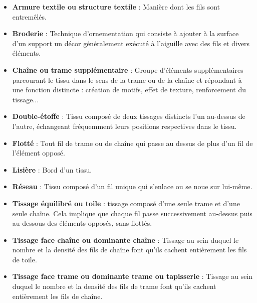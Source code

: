  \begin{itemize}
 	\item \textbf{Armure textile ou structure textile} : Manière dont les fils sont entremêlés.
	\item \textbf{Broderie} : Technique d'ornementation qui consiste à ajouter à la surface d'un support un décor généralement exécuté à l'aiguille avec des fils et divers éléments.
	\item \textbf{Chaîne ou trame supplémentaire} : Groupe d'éléments supplémentaires parcourant le tissu dans le sens de la trame ou de la chaîne et répondant à une fonction distincte : création de motifs, effet de texture, renforcement du tissage...
	\item \textbf{Double-étoffe} : Tissu composé de deux tissages distincts l'un au-dessus de l'autre, échangeant fréquemment leurs positions respectives dans le tissu.
	\item \textbf{Flotté} : Tout fil de trame ou de chaîne qui passe au dessus de plus d'un fil de l'élément opposé.
	\item \textbf{Lisière} : Bord d'un tissu.
	\item \textbf{Réseau} : Tissu composé d'un fil unique qui s'enlace ou se noue sur lui-même.
	\item \textbf{Tissage équilibré ou toile} : tissage composé d'une seule trame et d'une seule chaîne. Cela implique que chaque fil passe successivement au-dessus puis au-dessous des éléments opposés, sans flottés.
	\item \textbf{Tissage face chaîne ou dominante chaîne} : Tissage au sein duquel le nombre et la densité des fils de chaîne font qu'ils cachent entièrement les fils de toile.
	\item \textbf{Tissage face trame ou dominante trame ou tapisserie} : Tissage au sein duquel le nombre et la densité des fils de trame font qu'ils cachent entièrement les fils de chaîne.
\end{itemize}